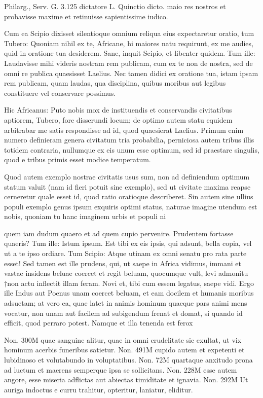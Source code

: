  Philarg., Serv. G. 3.125 dictatore L. Quinctio dicto. maio res nostros et probavisse maxime et retinuisse sapientissime iudico.

 Cum ea Scipio dixisset silentioque omnium reliqua eius expectaretur oratio, tum Tubero: Quoniam nihil ex te, Africane, hi maiores natu requirunt, ex me audies, quid in oratione tua desiderem. Sane, inquit Scipio, et libenter quidem. Tum ille: Laudavisse mihi videris nostram rem publicam, cum ex te non de nostra, sed de omni re publica quaesisset Laelius. Nec tamen didici ex oratione tua, istam ipsam rem publicam, quam laudas, qua disciplina, quibus moribus aut legibus constituere vel conservare possimus.

 Hic Africanus: Puto nobis mox de instituendis et conservandis civitatibus aptiorem, Tubero, fore disserundi locum; de optimo autem statu equidem arbitrabar me satis respondisse ad id, quod quaesierat Laelius. Primum enim numero definieram genera civitatum tria probabilia, perniciosa autem tribus illis totidem contraria, nullumque ex eis unum esse optimum, sed id praestare singulis, quod e tribus primis esset modice temperatum.

 Quod autem exemplo nostrae civitatis usus sum, non ad definiendum optimum statum valuit (nam id fieri potuit sine exemplo), sed ut civitate maxima reapse cerneretur quale esset id, quod ratio oratioque describeret. Sin autem sine ullius populi exemplo genus ipsum exquiris optimi status, naturae imagine utendum est nobis, quoniam tu hanc imaginem urbis et populi ni

 quem iam dudum quaero et ad quem cupio pervenire. Prudentem fortasse quaeris? Tum ille: Istum ipsum. Est tibi ex eis ipsis, qui adsunt, bella copia, vel ut a te ipso ordiare. Tum Scipio: Atque utinam ex omni senatu pro rata parte esset! Sed tamen est ille prudens, qui, ut saepe in Africa vidimus, immani et vastae insidens beluae coercet et regit beluam, quocumque vult, levi admonitu †non actu inflectit illam feram. Novi et, tibi cum essem legatus, saepe vidi. Ergo ille Indus aut Poenus unam coercet beluam, et eam docilem et humanis moribus adsuetam; at vero ea, quae latet in animis hominum quaeque pars animi mens vocatur, non unam aut facilem ad subigendum frenat et domat, si quando id efficit, quod perraro potest. Namque et illa tenenda est ferox

 Non. 300M quae sanguine alitur, quae in omni crudelitate sic exultat, ut vix hominum acerbis funeribus satietur. Non. 491M cupido autem et expetenti et lubidinoso et volutabundo in voluptatibus. Non. 72M quartaque anxitudo prona ad luctum et maerens semperque ipsa se sollicitans. Non. 228M esse autem angore, esse miseria adflictas aut abiectas timiditate et ignavia. Non. 292M Ut auriga indoctus e curru trahitur, opteritur, laniatur, eliditur.

